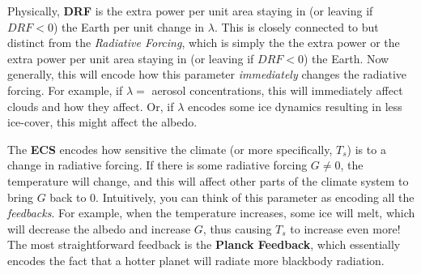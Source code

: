 Physically, \textbf{DRF} is the extra power per unit area staying in (or leaving if $DRF<0$) the Earth per unit change in $\lambda$. This is closely connected to but distinct from the \textit{Radiative Forcing}, which is simply the the extra power or the extra power per unit area staying in (or leaving if $DRF<0$) the Earth. Now generally, this will encode how this parameter \textit{immediately} changes the radiative forcing. For example, if $\lambda=$ aerosol concentrations, this will immediately affect clouds and how they affect. Or, if $\lambda$ encodes some ice dynamics resulting in less ice-cover, this might affect the albedo.

The \textbf{ECS} encodes how sensitive the climate (or more specifically, $T_s$) is to a change in radiative forcing. If there is some radiative forcing $G\neq 0$, the temperature will change, and this will affect other parts of the climate system to bring $G$ back to 0. Intuitively, you can think of this parameter as encoding all the \textit{feedbacks}. For example, when the temperature increases, some ice will melt, which will decrease the albedo and increase $G$, thus causing $T_s$ to increase even more! The most straightforward feedback is the \textbf{Planck Feedback}, which essentially encodes the fact that a hotter planet will radiate more blackbody radiation.

